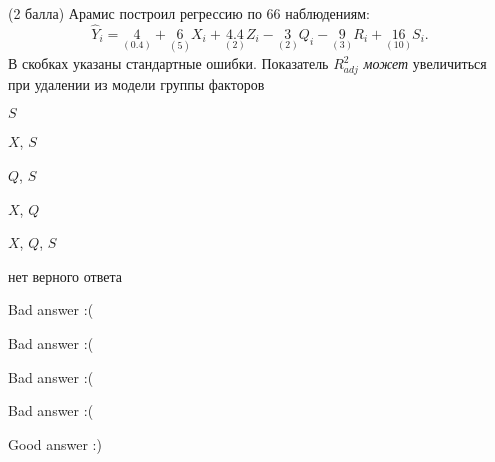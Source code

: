 
\begin{question}
(2 балла) Арамис построил регрессию по 66 наблюдениям: \[
\hat Y_i = \underset{(0.4)}{4} + \underset{(5)}{6}X_i + \underset{(2)}{4.4} Z_i - \underset{(2)}{3} Q_i - \underset{(3)}{9} R_i + \underset{(10)}{16} S_i.
\]
В скобках указаны стандартные ошибки.
Показатель \(R^2_{adj}\) \emph{может} увеличиться при удалении из
модели группы факторов
\begin{answerlist}
  \item \(S\)
  \item \(X\), \(S\)
  \item \(Q\), \(S\)
  \item \(X\), \(Q\)
  \item \(X\), \(Q\), \(S\)
  \item нет верного ответа
\end{answerlist}
\end{question}

\begin{solution}
\begin{answerlist}
  \item Bad answer :(
  \item Bad answer :(
  \item Bad answer :(
  \item Bad answer :(
  \item Good answer :)
\end{answerlist}
\end{solution}
